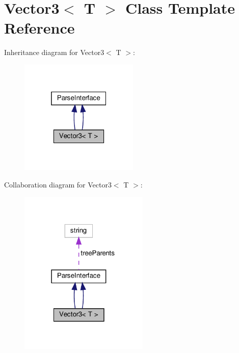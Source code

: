 \hypertarget{classVector3}{}\section{Vector3$<$ T $>$ Class Template Reference}
\label{classVector3}


Inheritance diagram for Vector3$<$ T $>$\+:
\nopagebreak
\begin{figure}[H]
\begin{center}
\leavevmode
\includegraphics[width=160pt]{classVector3__inherit__graph}
\end{center}
\end{figure}


Collaboration diagram for Vector3$<$ T $>$\+:
\nopagebreak
\begin{figure}[H]
\begin{center}
\leavevmode
\includegraphics[width=174pt]{classVector3__coll__graph}
\end{center}
\end{figure}
